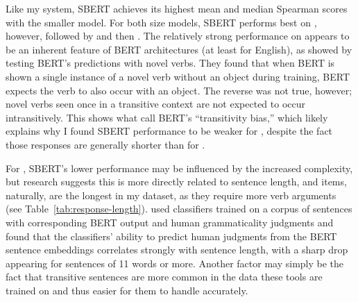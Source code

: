 Like my system, SBERT achieves its highest mean and median Spearman scores with the smaller model. For both size models, SBERT performs best on , however, followed by  and then .
The relatively strong performance on  appears to be an inherent feature of BERT architectures (at least for English), as \citet{thrush2020} showed by testing BERT's predictions with novel verbs. They found that when BERT is shown a single instance of a novel verb without an object during training, BERT expects the verb to also occur with an object. The reverse was not true, however; novel verbs seen once in a transitive context are not expected to occur intransitively. This shows what \citet{thrush2020} call BERT's ``transitivity bias,'' which likely explains why I found SBERT performance to be weaker for , despite the fact those responses are generally shorter than for .

For , SBERT's lower performance may be influenced by the increased complexity, but research suggests this is more directly related to sentence length, and  items, naturally, are the longest in my dataset, as they require more verb arguments (see Table~\ref{tab:response-length}). \citet{warstadt2019} used classifiers trained on a corpus of sentences with corresponding BERT output and human grammaticality judgments and found that the classifiers' ability to predict human judgments from the BERT sentence embeddings correlates strongly with sentence length, with a sharp drop appearing for sentences of 11 words or more. Another factor may simply be the fact that transitive sentences are more common in the data these tools are trained on and thus easier for them to handle accurately.

